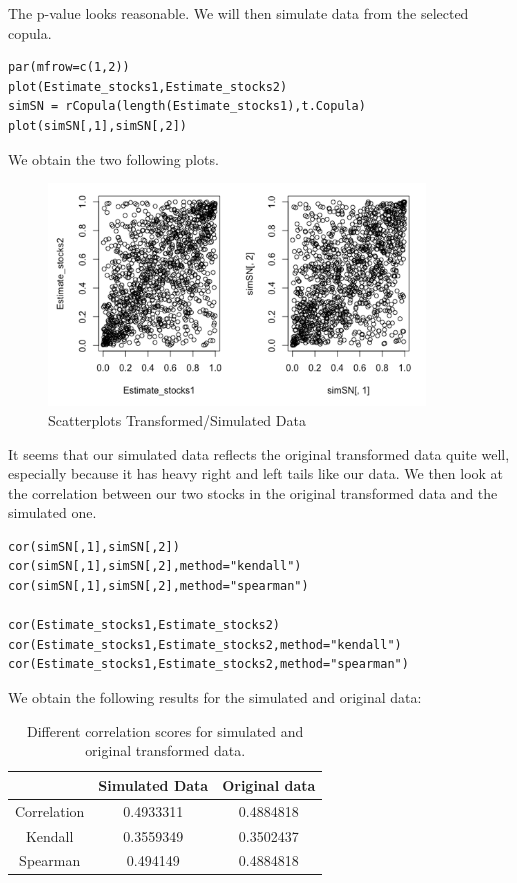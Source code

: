 \documentclass[11pt]{article}
\begin{document}
The p-value looks reasonable. We will then simulate data from the selected copula.
\begin{lstlisting}
par(mfrow=c(1,2))
plot(Estimate_stocks1,Estimate_stocks2)
simSN = rCopula(length(Estimate_stocks1),t.Copula)
plot(simSN[,1],simSN[,2])
\end{lstlisting}
We obtain the two following plots.
\pagebreak
\begin{figure}[!ht]
 \center
  \includegraphics[width=100mm]{Scatterplots}
  \caption{Scatterplots Transformed/Simulated Data}
  \label{fig:plot data}
\end{figure}

It seems that our simulated data reflects the original transformed data quite well, especially because it has heavy right and left tails like our data.
We then look at the correlation between our two stocks in the original transformed data and the simulated one.
\begin{lstlisting}
cor(simSN[,1],simSN[,2])
cor(simSN[,1],simSN[,2],method="kendall")
cor(simSN[,1],simSN[,2],method="spearman")

cor(Estimate_stocks1,Estimate_stocks2)
cor(Estimate_stocks1,Estimate_stocks2,method="kendall")
cor(Estimate_stocks1,Estimate_stocks2,method="spearman")

\end{lstlisting}
We obtain the following results for the simulated  and original data: 
\\
\begin{table}[H]
    \centering
    \begin{tabular}{c|c|c}
            & Simulated Data    & Original data \\  \hline
    Correlation & 0.4933311         & 0.4884818\\ \hline
    Kendall     & 0.3559349         & 0.3502437\\ \hline
    Spearman    & 0.494149          & 0.4884818
    \end{tabular}
    \caption{Different correlation scores for simulated and original transformed data.}
    \label{tab:correlation_scores}
\end{table}
\end{document}
